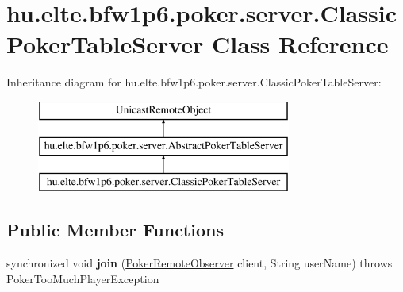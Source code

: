 \hypertarget{classhu_1_1elte_1_1bfw1p6_1_1poker_1_1server_1_1_classic_poker_table_server}{}\section{hu.\+elte.\+bfw1p6.\+poker.\+server.\+Classic\+Poker\+Table\+Server Class Reference}
\label{classhu_1_1elte_1_1bfw1p6_1_1poker_1_1server_1_1_classic_poker_table_server}
Inheritance diagram for hu.\+elte.\+bfw1p6.\+poker.\+server.\+Classic\+Poker\+Table\+Server\+:\begin{figure}[H]
\begin{center}
\leavevmode
\includegraphics[height=3.000000cm]{classhu_1_1elte_1_1bfw1p6_1_1poker_1_1server_1_1_classic_poker_table_server}
\end{center}
\end{figure}
\subsection*{Public Member Functions}
\begin{DoxyCompactItemize}
\item 
\hypertarget{classhu_1_1elte_1_1bfw1p6_1_1poker_1_1server_1_1_classic_poker_table_server_a3c4486368dcbfb49e3ec69ed0e3e1a18}{}synchronized void {\bfseries join} (\hyperlink{interfacehu_1_1elte_1_1bfw1p6_1_1poker_1_1client_1_1observer_1_1_poker_remote_observer}{Poker\+Remote\+Observer} client, String user\+Name)  throws Poker\+Too\+Much\+Player\+Exception \label{classhu_1_1elte_1_1bfw1p6_1_1poker_1_1server_1_1_classic_poker_table_server_a3c4486368dcbfb49e3ec69ed0e3e1a18}

\end{DoxyCompactItemize}
